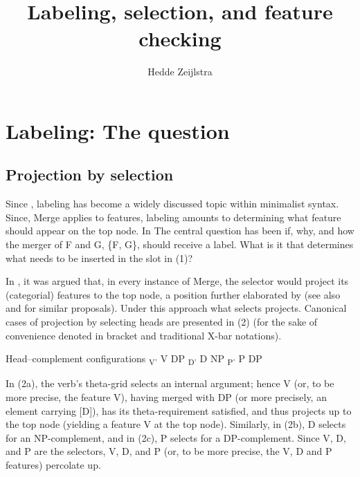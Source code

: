 \documentclass[output=paper
,modfonts
,nonflat]{langsci/langscibook}
\title{Labeling, selection, and feature checking}
\author{%
 Hedde Zeijlstra\affiliation{Georg-August-University Göttingen}
}
\begin{document}
	
\maketitle
\section{Labeling: The question}
\subsection{Projection by selection}
Since \citet{Chomsky1995}, labeling has become a widely discussed topic within minimalist syntax. Since, Merge applies to features, labeling amounts to determining what feature should appear on the top node. In The central question has been if, why, and how the merger of F and G, \{F, G\}, should receive a label. What is it that determines what needs to be inserted in the \ul{} slot in (1)?

\begin{figure}[!h]
\begin{exe}
\end{exe}
\end{figure}
\noindent In \citet{Chomsky1995}, it was argued that, in every instance of Merge, the selector would project its (categorial) features to the top node, a position further elaborated by \citet{Adger2003} (see also \citealt{Boeckx2008} and \citealt{Cecchetto_Donati2010} for similar proposals). Under this approach what selects projects. Canonical cases of projection by selecting heads are presented in (2) (for the sake of convenience denoted in bracket and traditional X-bar notations). 

\begin{exe}
\ex Head–complement configurations
	\xlist
	\ex {\lbrack} \textsubscript{V'} {\lbrack}V DP{\rbrack}{\rbrack}
	\ex {\lbrack} \textsubscript{D'} {\lbrack}D NP{\rbrack}{\rbrack}
	\ex {\lbrack} \textsubscript{P'} {\lbrack}P DP{\rbrack}{\rbrack}
	\endxlist
\end{exe}
In (2a), the verb’s theta-grid selects an internal argument; hence V (or, to be more precise, the feature {\lbrack}V{\rbrack}), having merged with DP (or more precisely, an element carrying [D]), has its theta-requirement satisfied, and thus projects up to the top node (yielding a feature {\lbrack}V{\rbrack} at the top node). Similarly, in (2b), D selects for an NP-complement, and in (2c), P selects for a DP-complement. Since V, D, and P are the selectors, V, D, and P (or, to be more precise, the {\lbrack}V{\rbrack}, {\lbrack}D{\rbrack} and {\lbrack}P{\rbrack} features) percolate up.
\end{document}
